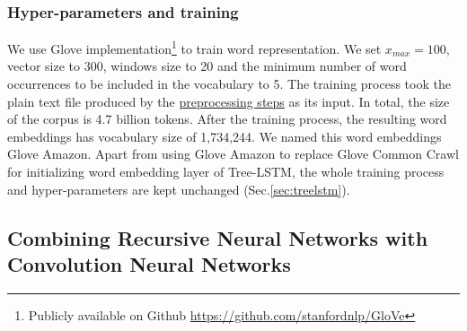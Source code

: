 \subsubsection{Hyper-parameters and training}
We use Glove implementation\footnote{Publicly available on Github \url{https://github.com/stanfordnlp/GloVe}} to train word representation.
We set $x_{max} = 100$, vector size to 300, windows size to 20 and the minimum number of word occurrences to be included in the vocabulary to 5.
The training process took the plain text file produced by the \hyperref[sec:preprocessamazonglove]{preprocessing steps} as its input.
In total, the size of the corpus is 4.7 billion tokens.
After the training process, the resulting word embeddings has vocabulary size of 1,734,244.
We named this word embeddings Glove Amazon.
Apart from using Glove Amazon to replace Glove Common Crawl for initializing word embedding layer of Tree-LSTM, the whole training process and hyper-parameters are kept unchanged (Sec.\ref{sec:treelstm}).

\subsection{Combining Recursive Neural Networks with Convolution Neural Networks}

